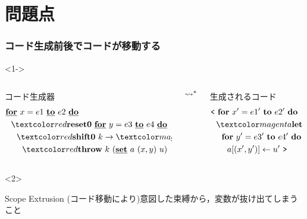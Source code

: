 \section{問題点}



\begin{frame}
  \frametitle{コード生成前後でコードが移動する}
  \begin{visibleenv}<1->
    \begin{columns}
      \begin{column}{0.5\textwidth}%
        コード生成器
        \begin{align*}
          & \cfordo{x = e1}{e2} \\
          & ~~\red{\Resetz~} \cfordo{y = e3}{e4} \\
          & ~~~~\red{\Shiftz~} k \to \magenta{\cLet~ u = y ~ \cIn} \\
          & ~~~~~~\red{\Throw~} k~ (\caryset{a}{(x,y)}{u})
        \end{align*}
      \end{column}
      $\leadsto^*$
      \begin{column}{0.5\textwidth}%
        生成されるコード
        \begin{align*}
          & \cbra~ \fordo{x' = e1'}{e2'} \\
          & ~~\magenta{\Let~ u' = y' ~ \In} \\
          & ~~~~\fordo{y' = e3'}{e4'} \\
          & ~~~~~~\aryset{a}{(x',y')}{u'}~ \cket
        \end{align*}
      \end{column}
    \end{columns}
  \end{visibleenv}

  \begin{visibleenv}<2>
    \begin{exampleblock}{Scope Extrusion}
      (コード移動により)意図した束縛から，変数が抜け出てしまうこと
    \end{exampleblock}
  \end{visibleenv}
\end{frame}

